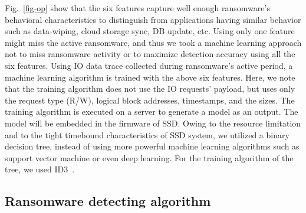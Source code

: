 \documentclass[conference]{IEEEtran}
\begin{document}
Fig.~\ref{fig-op} show that the six features capture well enough ransomware's behavioral characteristics
to distinguish from applications having similar behavior such as data-wiping, cloud storage sync, DB update, etc.
Using only one feature might miss the active ransomware, 
and thus we took a machine learning approach not to miss 
ransomware activity or to maximize detection accuracy using all the six features. 
Using IO data trace collected during ransomware's active period, 
a machine learning algorithm is trained with the above six features. 
Here, we note that the training algorithm does not use the IO requests' payload, 
but uses only the request type (R/W), logical block addresses, timestamps, and the sizes.
The training algorithm is executed on a server to generate a model as an output.
The model will be embedded in the firmware of SSD.
Owing to the resource limitation and to the tight timebound characteristics of SSD system,
we utilized a binary decision tree, instead of using more powerful machine learning
algorithms such as support vector machine or even deep learning.
For the training algorithm of the tree, we used ID3~\cite{quinlan86}.



\subsection{Ransomware detecting algorithm}
\label{sec:detection}
\end{document}

